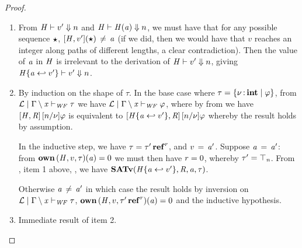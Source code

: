 \documentclass[runningheads]{llncs}
\begin{document}
\begin{proof}\leavevmode
  \begin{enumerate}
  \item From $ \mathit{H} \vdash   v'  \Downarrow  n $ and $ \mathit{H} \vdash   \mathit{H}  (  \mathit{a}  )  \Downarrow  n $, we must have that for
    any possible sequence $\oldvec{\star}$, $\ottsym{[}  \ottnt{H}  \ottsym{,}  v'  \ottsym{]}  \ottsym{(}  \oldvec{\star}  \ottsym{)} \, \neq \, \ottmv{a}$ (if we did, then
    we would have that $v$ reaches an integer along paths of different lengths, a clear
    contradiction). Then the value of $\mathit{a}$ in $\mathit{H}$ is irrelevant to the derivation
    of $ \mathit{H} \vdash   v'  \Downarrow  n $, giving $ \mathit{H}  \{  \mathit{a}  \hookleftarrow  v'  \} \vdash   v'  \Downarrow  n $.
  \item By induction on the shape of $\tau$. In the base case where $\tau  =   \left\{{  \nu  \operatorname{:} \mathbf{int} \mid  \varphi }\right\} $, from $ \mathcal{L}   \mid    \Gamma  \setminus  \mathit{x}    \vdash _{\mathit{WF}}  \tau $
    we have $ \mathcal{L}   \mid    \Gamma  \setminus  \mathit{x}    \vdash _{\mathit{WF}}  \varphi $, where by from  we have $[  \mathit{H}  ,  \mathit{R}  ] \, [  n  /  \nu  ]  \varphi$ is equivalent to
    $[  \mathit{H}  \{  \mathit{a}  \hookleftarrow  v'  \}  ,  \mathit{R}  ] \, [  n  /  \nu  ]  \varphi$ whereby the result holds by assumption.

    In the inductive step, we have $\tau  =   \tau'  \operatorname{\mathbf{ref}}^{ r } $, and $v \, = \, \mathit{a'}$.
    Suppose $\mathit{a} \, = \, \mathit{a'}$: from $\mathbf{own} \, (  \mathit{H}  ,  v  ,  \tau  )  (  \mathit{a}  )  =  0$ we must then have $r  =  0$,
    whereby $\tau'  =  \top_{\mathit{n}}$. From , item 1 above,
    , we have
    $ \mathbf{SATv} ( \mathit{H}  \{  \mathit{a}  \hookleftarrow  v'  \} , \mathit{R} , \mathit{a} , \tau ) $.

    Otherwise $\mathit{a} \, \neq \, \mathit{a'}$ in which case the result holds by inversion on
    $ \mathcal{L}   \mid    \Gamma  \setminus  \mathit{x}    \vdash _{\mathit{WF}}  \tau $, $\mathbf{own} \, (  \mathit{H}  ,  v  ,   \tau'  \operatorname{\mathbf{ref}}^{ r }   )  (  \mathit{a}  )  =  0$ and the inductive hypothesis.

  \item Immediate result of item 2.
  \end{enumerate}
\end{proof}
\end{document}
